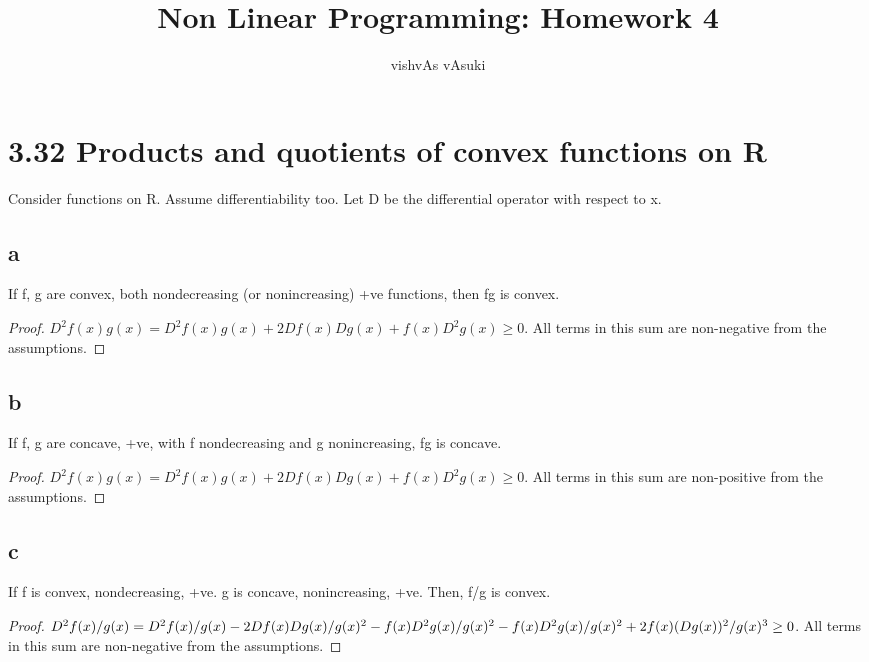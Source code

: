 \documentclass{article}
\title{Non Linear Programming: Homework 4}
\author{vishvAs vAsuki}
\begin{document}
\maketitle

\section{3.32 Products and quotients of convex functions on R}
\begin{rem}
Consider functions on R. Assume differentiability too. Let D be the differential operator with respect to x.
\end{rem}

\subsection{a}
\begin{thm}
If f, g are convex, both nondecreasing (or nonincreasing) +ve functions, then fg is convex.
\end{thm}
\begin{proof}
$D^{2} f(x)g(x) = D^{2}f(x) g(x) + 2 Df(x) Dg(x) + f(x)D^{2}g(x) \geq 0$. All terms in this sum are non-negative from the assumptions.
\end{proof}


\subsection{b}
\begin{thm}
If f, g are concave, +ve, with f nondecreasing and g nonincreasing, fg is concave.
\end{thm}
\begin{proof}
$D^{2} f(x)g(x) = D^{2}f(x) g(x) + 2 Df(x) Dg(x) + f(x)D^{2}g(x) \geq 0$. All terms in this sum are non-positive from the assumptions.
\end{proof}


\subsection{c}
\begin{thm}
If f is convex, nondecreasing, +ve. g is concave, nonincreasing, +ve. Then, f/g is convex.
\end{thm}
\begin{proof}
$D^{2} f(x)/g(x) = D^{2}f(x)/g(x) - 2 Df(x)Dg(x)/g(x)^2 - \\
f(x)D^{2}g(x)/g(x)^{2} - f(x)D^{2}g(x)/g(x)^{2} + 2f(x)(Dg(x))^2/ g(x)^3 \geq 0$. All terms in this sum are non-negative from the assumptions.
\end{proof}
\end{document}
